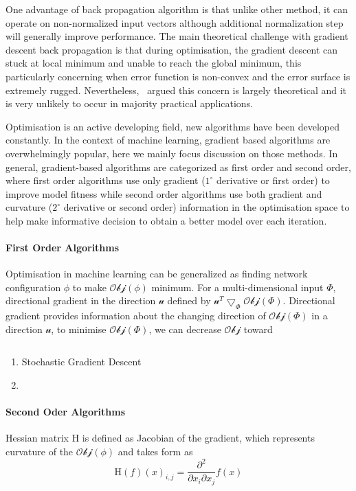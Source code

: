 One advantage of back propagation algorithm is that unlike other method, it can operate on non-normalized input vectors although additional normalization step will generally improve performance. \cite{Buckland:2002} The main theoretical challenge with gradient descent back propagation is that during optimisation, the gradient descent can stuck at local minimum and unable to reach the global minimum, this particularly concerning when error function is non-convex and the error surface is extremely rugged. Nevertheless,~\citet{LeCun_2015} argued this concern is largely theoretical and it is very unlikely to occur in majority practical applications.

Optimisation is an active developing field, new algorithms have been developed constantly. In the context of machine learning, gradient based algorithms are overwhelmingly popular, here we mainly focus discussion on those methods. In general, gradient-based algorithms are categorized as first order and second order, where first order algorithms use only gradient ($1^\circ$ derivative or first order) to improve model fitness while second order algorithms use both gradient and curvature ($2^\circ$ derivative or second order) information in the optimisation space to help make informative decision to obtain a better model over each iteration. \\

\paragraph {First Order Algorithms}
Optimisation in machine learning can be generalized as finding network configuration $\phi$ to make $\mathcal{Obj}(\phi)$ minimum. For a multi-dimensional input $\Phi$, directional gradient in the direction $\mathcal{u}$ defined by $\mathcal{u}^T\bigtriangledown_{\Phi}\mathcal{Obj}(\Phi)$. Directional gradient provides information about the changing direction of $\mathcal{Obj}(\Phi)$ in a direction $\mathcal{u}$, to minimise $\mathcal{Obj}(\Phi)$, we can decrease $\mathcal{Obj}$ toward 


\begin{equation}
    
\end{equation}

\begin{enumerate}
    \item Stochastic Gradient Descent \\
    \item \\
\end{enumerate}

\paragraph{Second Oder Algorithms}
Hessian matrix $\mathrm{H}$ is defined as Jacobian of the gradient, which represents curvature of the $\mathcal{Obj}(\phi)$ and takes form as 
\begin{equation}
    \mathrm{H}(f)(x)_{i,j} = \frac{\partial^2}{\partial x_i \partial x_j}f(x)
\end{equation}
